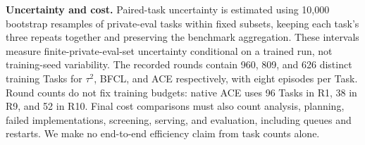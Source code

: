 \textbf{Uncertainty and cost.}\quad
Paired-task uncertainty is estimated using 10,000 bootstrap resamples of private-eval tasks within fixed subsets, keeping each task's three repeats together and preserving the benchmark aggregation. These intervals measure finite-private-eval-set uncertainty conditional on a trained run, not training-seed variability. The recorded rounds contain 960, 809, and 626 distinct training Tasks for $\tau^2$, BFCL, and ACE respectively, with eight episodes per Task. Round counts do not fix training budgets: native ACE uses 96 Tasks in R1, 38 in R9, and 52 in R10. Final cost comparisons must also count analysis, planning, failed implementations, screening, serving, and evaluation, including queues and restarts. We make no end-to-end efficiency claim from task counts alone.
